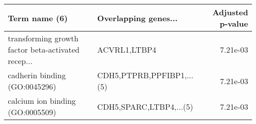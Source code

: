 \begin{tabular}{llr}
\toprule
                                     Term name (6) &      Overlapping genes... &  Adjusted p-value \\
\midrule
transforming growth factor beta-activated recep... &              ACVRL1,LTBP4 &          7.21e-03 \\
                     cadherin binding (GO:0045296) & CDH5,PTPRB,PPFIBP1,...(5) &          7.21e-03 \\
                  calcium ion binding (GO:0005509) &   CDH5,SPARC,LTBP4,...(5) &          7.21e-03 \\
\bottomrule
\end{tabular}
